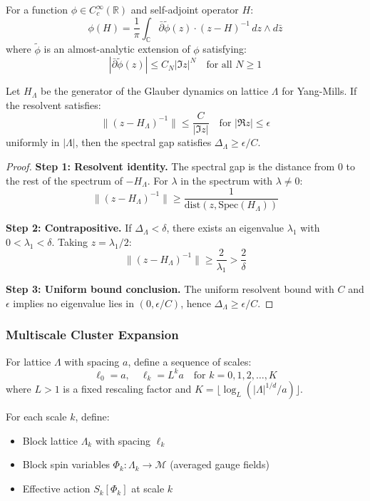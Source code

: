 \begin{definition}
\label{def:hs-formula}
For a function $\phi \in C_c^\infty(\mathbb{R})$ and self-adjoint operator $H$:
\[
\phi(H) = \frac{1}{\pi} \int_{\mathbb{C}} \bar{\partial}\tilde{\phi}(z) \cdot (z - H)^{-1} \, dz \wedge d\bar{z}
\]
where $\tilde{\phi}$ is an almost-analytic extension of $\phi$ satisfying:
\[
|\bar{\partial}\tilde{\phi}(z)| \leq C_N |\Im z|^N \quad \text{for all } N \geq 1
\]
\end{definition}

\begin{theorem}
\label{thm:hs-gap}
Let $H_\Lambda$ be the generator of the Glauber dynamics on lattice $\Lambda$ 
for Yang-Mills. If the resolvent satisfies:
\[
\|(z - H_\Lambda)^{-1}\| \leq \frac{C}{|\Im z|} \quad \text{for } |\Re z| \leq \epsilon
\]
uniformly in $|\Lambda|$, then the spectral gap satisfies $\Delta_\Lambda \geq \epsilon/C$.
\end{theorem}

\begin{proof}
\textbf{Step 1: Resolvent identity.}
The spectral gap is the distance from 0 to the rest of the spectrum of $-H_\Lambda$. 
For $\lambda$ in the spectrum with $\lambda \neq 0$:
\[
\|(z - H_\Lambda)^{-1}\| \geq \frac{1}{\text{dist}(z, \text{Spec}(H_\Lambda))}
\]

\textbf{Step 2: Contrapositive.}
If $\Delta_\Lambda < \delta$, there exists an eigenvalue $\lambda_1$ with 
$0 < \lambda_1 < \delta$. Taking $z = \lambda_1/2$:
\[
\|(z - H_\Lambda)^{-1}\| \geq \frac{2}{\lambda_1} > \frac{2}{\delta}
\]

\textbf{Step 3: Uniform bound conclusion.}
The uniform resolvent bound with $C$ and $\epsilon$ implies no eigenvalue 
lies in $(0, \epsilon/C)$, hence $\Delta_\Lambda \geq \epsilon/C$.
\end{proof}

\subsubsection{Multiscale Cluster Expansion}

\begin{definition}
\label{def:scale-decomp}
For lattice $\Lambda$ with spacing $a$, define a sequence of scales:
\[
\ell_0 = a, \quad \ell_k = L^k a \quad \text{for } k = 0, 1, 2, \ldots, K
\]
where $L > 1$ is a fixed rescaling factor and $K = \lfloor \log_L(|\Lambda|^{1/d}/a) \rfloor$.

For each scale $k$, define:
\begin{itemize}
\item Block lattice $\Lambda_k$ with spacing $\ell_k$
\item Block spin variables $\Phi_k: \Lambda_k \to \mathcal{M}$ (averaged gauge fields)
\item Effective action $S_k[\Phi_k]$ at scale $k$
\end{itemize}
\end{definition}

